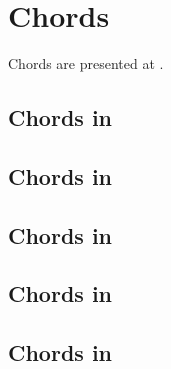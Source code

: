 



\chapter{Chords}\label{Chords}

Chords are presented at .


\section{Chords in \mxsrToMsr{}}


\section{Chords in \mxsrToMsr{}}


\section{Chords in \msrToMsr{}}


\section{Chords in \msrToLpsr{}}


\section{Chords in \lpsrToLilypond{}}


